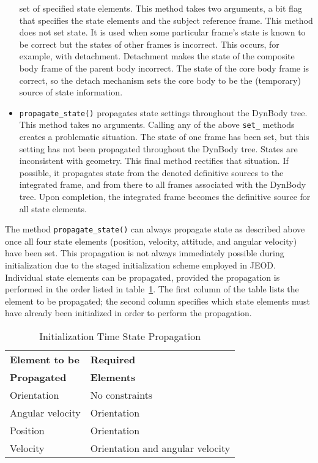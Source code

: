 \begin{itemize}
  set of specified state elements. This method takes two arguments,
  a bit flag that specifies the state elements and the subject reference frame.
  This method does not set state. It is used when some particular frame's state
  is known to be correct but the states of other frames is incorrect.
  This occurs, for example, with detachment. Detachment makes the state of the
  composite body frame of the parent body incorrect. The state of the core
  body frame is correct, so the detach mechanism sets the core body to be the
  (temporary) source of state information.
\item \verb+propagate_state()+
  propagates state settings throughout the DynBody tree.
  This method takes no arguments.
  Calling any of the above \verb+set_+ methods creates a problematic
  situation. The state of one frame has been set, but this setting has not
  been propagated throughout the DynBody tree. States are inconsistent with
  geometry. This final method rectifies that situation. If possible,
  it propagates state from the denoted definitive sources to the integrated
  frame, and from there to all frames associated with the DynBody tree.
  Upon completion, the integrated frame becomes the definitive source for all
  state elements.
\end{itemize}

The method \verb+propagate_state()+ can always propagate state as described above once all four state elements (position, velocity, attitude, and angular
velocity) have been set. This propagation is not always immediately possible
during initialization due to the staged initialization scheme employed in JEOD.
Individual state elements can be propagated, provided the propagation is
performed in the order listed in table~\ref{tab:init_prop}.
The first column of the table lists the element to be propagated;
the second column specifies which state elements must have already been
initialized in order to perform the propagation.

\begin{table}[htp]
\centering
\caption{Initialization Time State Propagation}
\label{tab:init_prop}
\vspace{1ex}
\begin{tabular}{||l|l|} \hline
{\bf Element to be} & {\bf Required} \\
{\bf Propagated} & {\bf Elements} \\
\hline \hline
Orientation & No constraints \\
Angular velocity & Orientation \\
Position & Orientation \\
Velocity & Orientation and angular velocity \\
\hline
\end{tabular}
\end{table}


